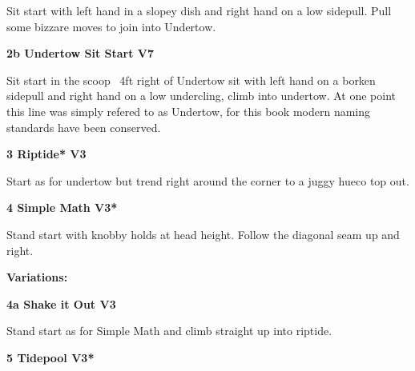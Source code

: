 \begin{multicols}{2}
\begin{adjustwidth}{0.5cm}{}
\begin{minipage}{\linewidth}
							\begin{adjustwidth}{0.5cm}{}				
							Sit start with left hand in a slopey dish and right hand on a low sidepull. Pull some bizzare moves to join into Undertow.
							\end{adjustwidth}
							\end{minipage}
							\begin{minipage}{\linewidth}	
							\label{vr:Undertow Sit Start}
\colorbox{Goldenrod!50}{
\parbox{0.95\textwidth}{
\textbf{
2b Undertow Sit Start V7     
}
}
}

							\begin{adjustwidth}{0.5cm}{}				
							Sit start in the scoop ~4ft right of Undertow sit with left hand on a borken sidepull and right hand on a low undercling, climb into undertow. At one point this line was simply refered to as Undertow, for this book modern naming standards have been conserved.
							\end{adjustwidth}
							\end{minipage}
						\end{adjustwidth}
					\begin{minipage}{\linewidth}	
					\label{rt:Riptide}
\colorbox{green!20}{
\parbox{0.95\textwidth}{
\textbf{
3 Riptide* V3    
}
}
}

					\begin{adjustwidth}{0.5cm}{}				
					Start as for undertow but trend right around the corner to a juggy hueco top out.
					\end{adjustwidth}
					\end{minipage}
					\begin{minipage}{\linewidth}	
					\label{rt:Simple Math}
\colorbox{green!20}{
\parbox{0.95\textwidth}{
\textbf{
4 Simple Math V3*  
}
}
}

					\begin{adjustwidth}{0.5cm}{}				
					Stand start with knobby holds at head height. Follow the diagonal seam up and right.
					\end{adjustwidth}
					\end{minipage}
						\begin{adjustwidth}{0.5cm}{}				
						\textbf{Variations:} \newline
							\begin{minipage}{\linewidth}	
							\label{vr:Shake it Out}
\colorbox{green!20}{
\parbox{0.95\textwidth}{
\textbf{
4a Shake it Out V3   
}
}
}

							\begin{adjustwidth}{0.5cm}{}				
							Stand start as for Simple Math and climb straight up into riptide.
							\end{adjustwidth}
							\end{minipage}
						\end{adjustwidth}
					\begin{minipage}{\linewidth}	
					\label{rt:Tidepool}
\colorbox{green!20}{
\parbox{0.95\textwidth}{
\textbf{
5 Tidepool V3*  
}
}
}


\end{minipage}
\end{multicols}
